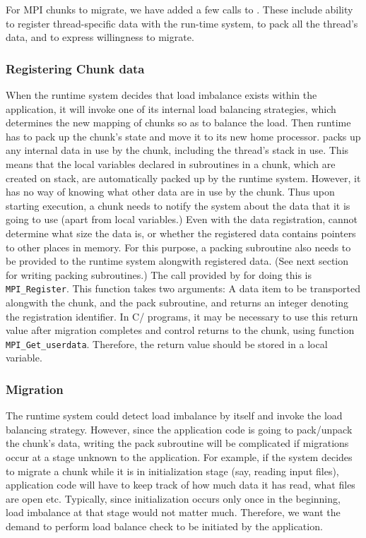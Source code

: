 \documentclass[10pt]{article}
\begin{document}
For MPI chunks to migrate, we have added a few calls to \ampi{}. These include
ability to register thread-specific data with the run-time system, to pack all
the thread's data, and to express willingness to migrate.

\subsubsection{Registering Chunk data}

When the \ampi{} runtime system decides that load imbalance exists within the
application, it will invoke one of its internal load balancing strategies,
which determines the new mapping of \ampi{} chunks so as to balance the load.
Then \ampi{} runtime has to pack up the chunk's state and move it to its new
home processor. \ampi{} packs up any internal data in use by the chunk,
including the thread's stack in use. This means that the local variables
declared in subroutines in a chunk, which are created on stack, are
automatically packed up by the \ampi{} runtime system. However, it has no way
of knowing what other data are in use by the chunk. Thus upon starting
execution, a chunk needs to notify the system about the data that it is going
to use (apart from local variables.) Even with the data registration, \ampi{}
cannot determine what size the data is, or whether the registered data contains
pointers to other places in memory. For this purpose, a packing subroutine also
needs to be provided to the \ampi{} runtime system alongwith registered data.
(See next section for writing packing subroutines.) The call provided by
\ampi{} for doing this is \texttt{MPI\_Register}. This function takes two
arguments: A data item to be transported alongwith the chunk, and the pack
subroutine, and returns an integer denoting the registration identifier. In
C/\CC{} programs, it may be necessary to use this return value after migration
completes and control returns to the chunk, using function
\texttt{MPI\_Get\_userdata}. Therefore, the return value should be stored in a
local variable.

\subsubsection{Migration}

The \ampi{} runtime system could detect load imbalance by itself and invoke the
load balancing strategy. However, since the application code is going to
pack/unpack the chunk's data, writing the pack subroutine will be complicated
if migrations occur at a stage unknown to the application. For example, if the
system decides to migrate a chunk while it is in initialization stage (say,
reading input files), application code will have to keep track of how much data
it has read, what files are open etc. Typically, since initialization occurs
only once in the beginning, load imbalance at that stage would not matter much.
Therefore, we want the demand to perform load balance check to be initiated by
the application.
\end{document}

